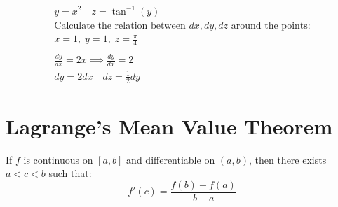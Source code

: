 \documentclass[00_complete]{subfiles}
\begin{document}
\begin{example}
    $$
    \begin{gathered}
        y = x^2 \quad z = \tan^{-1}(y) \\
        \text{Calculate the relation between $dx, dy, dz$ around the points:}
        \\
        x=1,\;y=1,\;z=\frac{\pi}{4} \\ \\
        \frac{dy}{dx} =2x \implies \frac{dy}{dx} = 2 \\
        dy = 2dx \quad dz = \frac{1}{2}dy
    \end{gathered}
    $$
\end{example}

\section{Lagrange's Mean Value Theorem}

\begin{definition}
    If $f$ is continuous on $[a,b]$ and differentiable on $(a,b)$, then there
    exists $a<c<b$ such that:
    \[
        f'(c) = \frac{f(b)-f(a)}{b-a}
    \]
\end{definition}
\end{document}
